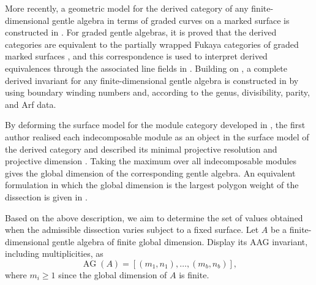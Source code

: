 \documentclass[11pt]{amsart}
\theoremstyle{definition}
\theoremstyle{plain}
\theoremstyle{definition}
\theoremstyle{definition}
\newcommand{\AG}{\operatorname{AG}}
\begin{document}
More recently, a geometric model for the derived category of any finite-dimensional gentle algebra in
  terms of graded curves on a marked surface is constructed in \cite{OpperPlamondonSchroll}.
  For graded gentle algebras, it is proved that the derived categories are equivalent to the partially wrapped Fukaya categories
  of graded marked surfaces \cite{HaidenKatzarkovKontsevich, LekiliPolishchuk}, and this correspondence is used to interpret derived
  equivalences through the associated line fields in \cite{LekiliPolishchuk}.
Building on \cite{LekiliPolishchuk}, a complete derived invariant for any finite-dimensional gentle algebra is constructed in 
\cite{AmiotPlamondonSchroll} by using boundary winding numbers
and, according to the genus, divisibility, parity, and Arf data. 

By deforming the surface model for the module category developed
in \cite{BaurCoelhoSimoes}, the first author realised each
indecomposable module as an object in the surface model of the
derived category and described its minimal projective resolution
and projective dimension \cite{Chang}. Taking the maximum over all indecomposable modules gives the
global dimension of the corresponding gentle algebra.  An equivalent formulation in which the global dimension is the
largest polygon weight of the dissection is given in
\cite{LiuGaoHuang}.  

Based on the above description, we aim to determine the set of
values obtained when the admissible dissection varies subject to a fixed
surface.
Let $A$ be a finite-dimensional gentle algebra of finite global dimension.  Display its
AAG invariant, including multiplicities, as
\begin{equation}
\label{eq:intro-AAG-list}
 \AG(A)=[(m_1,n_1),\ldots,(m_b,n_b)],
\end{equation}
where $m_i\geq 1$ since the global dimension of $A$ is finite. 
\end{document}
